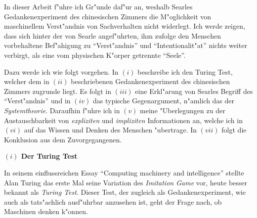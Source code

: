 \documentclass[a4paper, emulatestandardclasses, 12pt]{scrartcl}
\begin{document}
\begin{onehalfspace} 

%


\noindent In dieser Arbeit f"uhre ich Gr"unde daf"ur an, weshalb Searles Gedankenexperiment des chinesischen Zimmers die M"oglichkeit von maschinellem Verst"andnis von Sachverhalten nicht widerlegt. Ich werde zeigen, dass sich hinter der von Searle angef"uhrten, ihm zufolge den Menschen vorbehaltene Bef"ahigung zu "`Verst"andnis"' und "`Intentionalit"at"' nichts weiter verbirgt, als eine vom physischen K"orper getrennte "`Seele"'.

Dazu werde ich wie folgt vorgehen. In $(i)$ beschreibe ich den Turing Test, welcher dem in $(ii)$ beschriebenen Gedankenexperiment des chinesischen Zimmers zugrunde liegt. Es folgt in  $(iii)$ eine Erkl"arung von Searles Begriff des "`Verst"andnis"' und in $(iv)$ das typische Gegenargument, n"amlich das der \emph{Systemtheorie}. Daraufhin f"uhre ich in $(v)$ meine "Uberlegungen zu der Austauschbarkeit von \emph{expliziten} und \emph{impliziten} Informationen an, welche ich in $(vi)$ auf das Wissen und Denken des Menschen "ubertrage. In $(vii)$ folgt die Konklusion aus dem Zuvorgegangenen.
\vspace{5mm}


\noindent\textbf{$(i)$ Der Turing Test}

\noindent In seinem einflussreichen Essay "`Computing machinery and intelligence"' \citep{turing1950computing} stellte Alan Turing das erste Mal seine Variation des \emph{Imitation Game} vor, heute besser bekannt als \emph{Turing Test}. Dieser Test, der zugleich als Gedankenexperiment, wie auch als tats"achlich ausf"uhrbar anzusehen ist, geht der Frage nach, ob Maschinen denken k"onnen. 


\end{onehalfspace}
\end{document}
